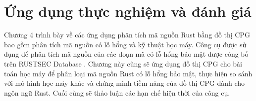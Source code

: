 \chapter{Ứng dụng thực nghiệm và đánh giá}
\label{chap:experiment}


Chương 4 trình bày về các ứng dụng phân tích mã nguồn Rust bằng đồ thị CPG bao gồm phân tích mã nguồn có lỗ hổng và kỹ thuật học máy.
Công cụ được sử dụng để phân tích mã nguồn của các đoạn mã có lỗ hổng bảo mật được công bố trên RUSTSEC Database \cite{rustsecAboutRustSec}.
Chương này cũng sẽ ứng dụng đồ thị CPG cho bài toán học máy để phân loại mã nguồn Rust có lỗ hổng bảo mật, thực hiện so sánh với mô hình học máy khác và chứng minh tiềm năng của đồ thị CPG dành cho ngôn ngữ Rust.
Cuối cùng sẽ thảo luận các hạn chế hiện thời của công cụ.




